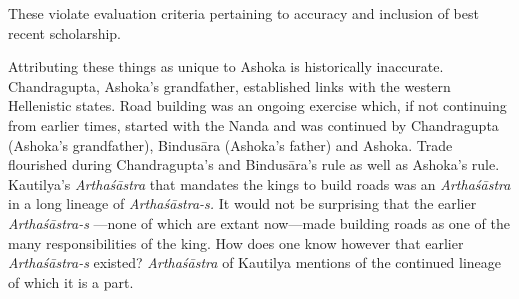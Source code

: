 These violate evaluation criteria pertaining to accuracy and inclusion of best recent scholarship. 

Attributing these things as unique to Ashoka is historically inaccurate. Chandragupta, Ashoka's grandfather, established links with the western Hellenistic states. Road building was an ongoing exercise which, if not continuing from earlier times, started with the Nanda and was continued by Chandragupta (Ashoka’s grandfather), Bindusāra (Ashoka's father) and Ashoka. Trade flourished during Chandragupta's and Bindusāra's rule as well as Ashoka's rule. Kautilya’s \textit{Arthaśāstra} that mandates the kings to build roads was an \textit{Arthaśāstra} in a long lineage of \textit{Arthaśāstra-s.} It would not be surprising that the earlier \textit{Arthaśāstra-s} —none of which are extant now—made building roads as one of the many responsibilities of the king. How does one know however that earlier \textit{Arthaśāstra-s} existed? \textit{Arthaśāstra} of Kautilya mentions of the continued lineage of which it is a part.
